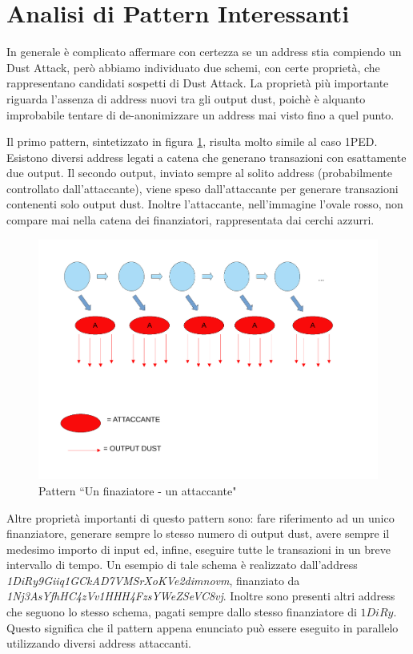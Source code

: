 \section{Analisi di Pattern Interessanti}\label{pattern}
In generale è complicato affermare con certezza se un address stia compiendo un Dust Attack, però abbiamo individuato due schemi, con certe proprietà, che rappresentano candidati sospetti di Dust Attack. La proprietà più importante riguarda l'assenza di address nuovi tra gli output dust, poichè è alquanto improbabile tentare di de-anonimizzare un address mai visto fino a quel punto.

Il primo pattern, sintetizzato in figura \ref{fig:schema1}, risulta molto simile al caso 1PED. Esistono diversi address legati a catena che generano transazioni con esattamente due output. Il secondo output, inviato sempre al solito address (probabilmente controllato dall'attaccante), viene speso dall'attaccante per generare transazioni contenenti solo output dust. Inoltre l'attaccante, nell'immagine l'ovale rosso, non compare mai nella catena dei finanziatori, rappresentata dai cerchi azzurri.
\begin{figure}[h!]
    \centering
    \includegraphics[scale=0.4]{Images/dust_attack1.pdf}
    \caption{Pattern ``Un finaziatore - un attaccante"}
    \label{fig:schema1}
\end{figure}
\FloatBarrier
Altre proprietà importanti di questo pattern sono: fare riferimento ad un unico finanziatore, generare sempre lo stesso numero di output dust, avere sempre il medesimo importo di input ed, infine, eseguire tutte le transazioni in un breve intervallo di tempo. Un esempio di tale schema è realizzato dall'address \textit{1DiRy9Giiq1GCkAD7VMSrXoKVe2dimnovm}, finanziato da \textit{1Nj3AsYfhHC4zVv1HHH4FzsYWeZSeVC8vj}. Inoltre sono presenti altri address che seguono lo stesso schema, pagati sempre dallo stesso finanziatore di $1DiRy$. Questo significa che il pattern appena enunciato può essere eseguito in parallelo utilizzando diversi address attaccanti.


